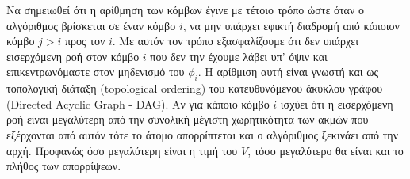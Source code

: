\documentclass[a4paper,12pt]{article}
\begin{document}
Να σημειωθεί ότι η αρίθμηση των κόμβων έγινε με τέτοιο τρόπο ώστε όταν ο αλγόριθμος βρίσκεται σε έναν κόμβο $i$, 
να μην υπάρχει εφικτή διαδρομή από κάποιον κόμβο $j > i$ προς τον $i$. Με αυτόν τον τρόπο εξασφαλίζουμε ότι δεν 
υπάρχει εισερχόμενη ροή στον κόμβο $i$ που δεν την έχουμε λάβει υπ' όψιν και επικεντρωνόμαστε στον μηδενισμό του 
$\phi_i$. Η αρίθμιση αυτή είναι γνωστή και ως τοπολογική διάταξη (topological
ordering) του κατευθυνόμενου άκυκλου γράφου
(Directed Acyclic Graph - DAG). Αν για κάποιο κόμβο $i$ ισχύει ότι η εισερχόμενη ροή είναι 
μεγαλύτερη από την συνολική μέγιστη χωρητικότητα των ακμών που εξέρχονται από αυτόν τότε το άτομο απορρίπτεται 
και ο αλγόριθμος ξεκινάει από την αρχή. Προφανώς όσο μεγαλύτερη είναι η τιμή του $V$, τόσο μεγαλύτερο θα είναι 
και το πλήθος των απορρίψεων.
\end{document}
